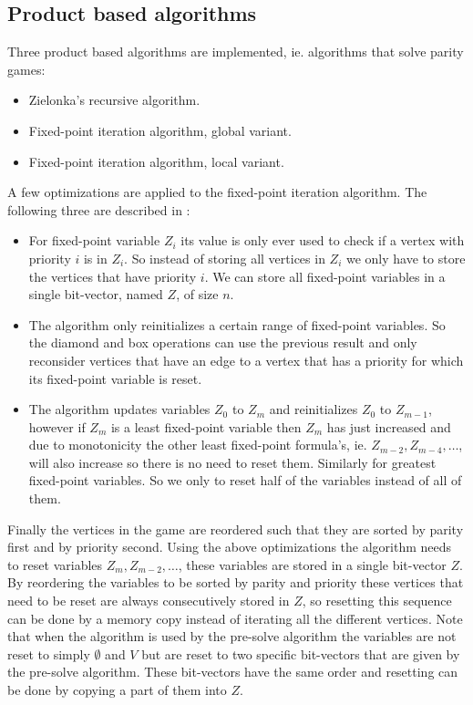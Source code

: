 \subsection{Product based algorithms}
Three product based algorithms are implemented, ie. algorithms that solve parity games:
\begin{itemize}
	\item Zielonka's recursive algorithm.
	\item Fixed-point iteration algorithm, global variant.
	\item Fixed-point iteration algorithm, local variant.
\end{itemize}
A few optimizations are applied to the fixed-point iteration algorithm. The following three are described in \cite{FPITE}:
\begin{itemize}
	\item For fixed-point variable $Z_i$ its value is only ever used to check if a vertex with priority $i$ is in $Z_i$. So instead of storing all vertices in $Z_i$ we only have to store the vertices that have priority $i$. We can store all fixed-point variables in a single bit-vector, named $Z$, of size $n$.
	\item The algorithm only reinitializes a certain range of fixed-point variables. So the diamond and box operations can use the previous result and only reconsider vertices that have an edge to a vertex that has a priority for which its fixed-point variable is reset.
	\item The algorithm updates variables $Z_0$ to $Z_m$ and reinitializes $Z_0$ to $Z_{m-1}$, however if $Z_m$ is a least fixed-point variable then $Z_m$ has just increased and due to monotonicity the other least fixed-point formula's, ie. $Z_{m-2},Z_{m-4},\dots$, will also increase so there is no need to reset them. Similarly for greatest fixed-point variables. So we only to reset half of the variables instead of all of them.
\end{itemize}
Finally the vertices in the game are reordered such that they are sorted by parity first and by priority second. Using the above optimizations the algorithm needs to reset variables $Z_{m}, Z_{m-2},\dots$, these variables are stored in a single bit-vector $Z$. By reordering the variables to be sorted by parity and priority these vertices that need to be reset are always consecutively stored in $Z$, so resetting this sequence can be done by a memory copy instead of iterating all the different vertices. Note that when the algorithm is used by the pre-solve algorithm the variables are not reset to simply $\emptyset$ and $V$ but are reset to two specific bit-vectors that are given by the pre-solve algorithm. These bit-vectors have the same order and resetting can be done by copying a part of them into $Z$.


